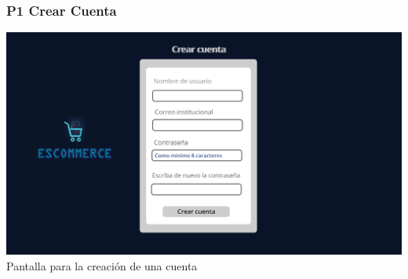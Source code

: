 \documentclass[14pt]{article}
\begin{document}
            \newpage
            
            \subsubsection{P1 Crear Cuenta}\label{P1 Crear Cuenta}
                \begin{center}
                    \includegraphics[height=0.55\textwidth]{CrearCuenta.jpg}
                    \label{fig:CrearCuenta} \\ [Figura 2] Pantalla para la creación de una cuenta
                \end{center}
\end{document}
